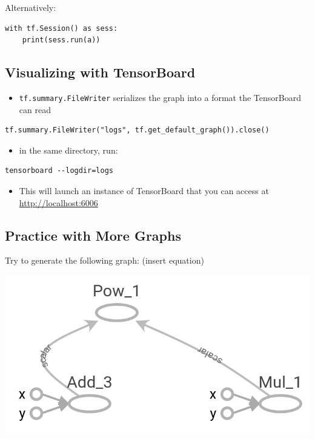 \documentclass[11pt]{article}
\begin{document}
Alternatively:

\begin{verbatim}
with tf.Session() as sess:
    print(sess.run(a))
\end{verbatim}

\subsection*{Visualizing with TensorBoard}
\label{sec:org137f65c}

\begin{itemize}
\item \texttt{tf.summary.FileWriter} serializes the graph into a format the TensorBoard can read
\end{itemize}

\begin{verbatim}
tf.summary.FileWriter("logs", tf.get_default_graph()).close()
\end{verbatim}

\begin{itemize}
\item in the same directory, run:
\end{itemize}

\begin{verbatim}
tensorboard --logdir=logs
\end{verbatim}

\begin{itemize}
\item This will launch an instance of TensorBoard that you can access at \url{http://localhost:6006}
\end{itemize}

\subsection*{Practice with More Graphs}
\label{sec:orgc6faade}

Try to generate the following graph: (insert equation)

\begin{center}
\begin{center}
\includegraphics[width=.9\linewidth]{images/graph2.png}
\end{center}
\end{center}
\end{document}
